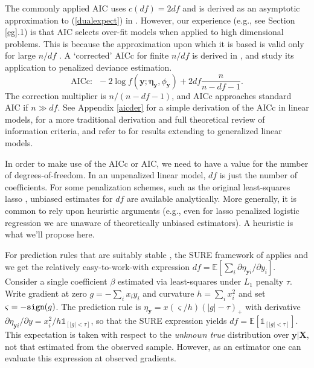 \documentclass[12pt]{article}
\newcommand{\bs}[1]{\boldsymbol{#1}}
\newcommand{\bm}[1]{\mathbf{#1}}
\newcommand{\ds}[1]{\mathds{#1}}
\begin{document}
The commonly applied AIC uses $c(df)=2df$ and is derived as an asymptotic approximation to (\ref{dualexpect}) in 
\cite{akaike_information_1973}.  However, our experience (e.g., see Section
\ref{eg}.1) is that AIC selects over-fit models when applied to high dimensional
problems.  This is because the approximation upon which it is based
is valid only for large $n/df$ \citep{burnham_model_2002}.  A `corrected' AICc
for finite $n/df$ is derived in
\cite{hurvich_regression_1989}, and \citet{flynn_efficiency_2013} study its
application to penalized deviance estimation.
\begin{equation}
\text{AICc:}~~~-2\log f(\bm{y}; \bs{\eta}_{\bm{y}},\phi_{\bm{y}}) + 2df\frac{n}{n-df-1}.
\end{equation}
The correction multiplier is $n/(n-df-1)$, and AICc approaches standard AIC if
$n\gg df$. See Appendix \ref{aicder} for a simple derivation of the AICc in
linear models, \cite{claeskens_model_2008} for a more traditional derivation
and full theoretical review of information criteria, and refer to
\citet{flynn_efficiency_2013} for results extending to generalized linear
models.

In order to make use of the AICc or AIC, we need to have a value for the
number of degrees-of-freedom. In an unpenalized linear model, $df$ is just the
number of coefficients.   For some penalization schemes, such as the original
least-squares lasso
\citep{zou_degrees_2007}, unbiased estimates for $df$ are available
analytically.   More generally, it is common to rely upon heuristic arguments
(e.g., even for lasso penalized logistic regression we are unaware of
theoretically unbiased estimators).  A heuristic is what we'll propose here.

For prediction rules that are suitably stable \citep[i.e., Lipschitz; see][]{zou_degrees_2007}, the SURE framework of
\cite{stein_estimation_1981} applies and we get the relatively
easy-to-work-with expression  $df =
\ds{E}\left[\sum_i \partial \eta_{\bm{y}i}/\partial y_i\right]$.
Consider  a single coefficient $\beta$ estimated via least-squares under $L_1$
penalty $\tau$.   Write gradient at zero $g = -\sum_i x_iy_i$ and curvature $h
= \sum_i x_i^2$ and set $\varsigma = -{\tt sign}(g)$. The prediction rule is
$\eta_{\bm{y}} = x(\varsigma/h)(|g|-\tau)_+$ with  derivative $\partial \eta_{\bm{y}i}/\partial y = x_i^2/h \ds{1}_{[|g|<\tau]}$, so that the SURE expression
yields $df = \ds{E}\left[ \ds{1}_{[|g|<\tau]} \right]$.   This expectation is
taken with respect to the {\it unknown true} distribution over $\bm{y} |
\bm{X}$, not that estimated from the observed sample.  However, as an estimator
\citep[e.g.,][]{zou_degrees_2007} one can evaluate this expression at observed
gradients.
\end{document}

